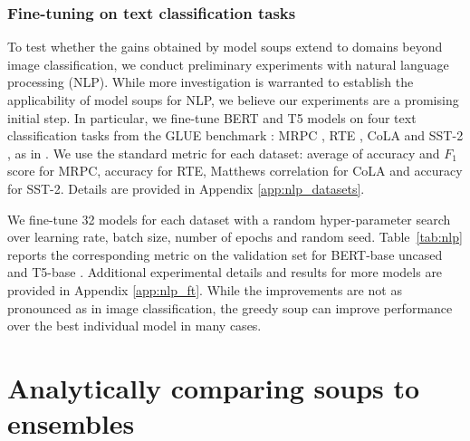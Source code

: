 \documentclass[nohyperref]{article}
\theoremstyle{plain}
\theoremstyle{definition}
\theoremstyle{remark}
\begin{document}
        \subsubsection{Fine-tuning on text classification tasks}\label{sec:nlp}
    
        To test whether the gains obtained by model soups extend to domains beyond image classification, we conduct preliminary experiments with natural language processing (NLP). 
        While more investigation is warranted
        to establish the applicability of model soups for NLP, we believe our experiments are a promising initial step.
        In particular, we fine-tune BERT \cite{devlin2019bert} and T5 \cite{raffel2020t5} models on four text classification tasks from the GLUE benchmark \cite{wang2018glue}: MRPC \cite{dolan2005automatically}, RTE \cite{dagan2005pascal, bar2006second, giampiccolo2007third, bentivogli2009fifth}, CoLA \cite{warstadt2018neural} and SST-2 \cite{socher2013recursive}, as in \cite{dodge2020fine}. We use the standard metric for each dataset: average of accuracy and $F_1$ score for MRPC, accuracy for RTE, Matthews correlation for CoLA \cite{matthews1975comparison} and accuracy for SST-2. Details are provided in Appendix \ref{app:nlp_datasets}.
        
        We fine-tune 32 models for each dataset with a random hyper-parameter search over learning rate, batch size, number of epochs and random seed. Table~\ref{tab:nlp} reports the corresponding metric on the validation set for BERT-base uncased \cite{devlin-etal-2019-bert} and T5-base \cite{raffel2020t5}. Additional experimental details and results for more models are provided in Appendix \ref{app:nlp_ft}. While the improvements are not as pronounced as in image classification, the greedy soup can improve performance over the best individual model in many cases.
        
        
        \section{Analytically comparing soups to ensembles}\label{sec:theory}
          
        \newcommand{\grad}{\nabla}%
        \newcommand{\hess}{\nabla^{2}}%
        \newcommand{\R}{\mathbb{R}}%
        \newcommand{\E}{\mathbb{E}}%
        \newcommand{\err}{\mathrm{err}}
        \newcommand{\errens}{\mathrm{err}^{\mathrm{ens}}}
        \newcommand{\fose}{f_\alpha^{\mathrm{ens}}}%
        \newcommand{\fwse}{f_\alpha^{\mathrm{soup}}}%
        \newcommand{\defeq}{\coloneqq}%
        \newcommand{\indic}[1]{1{\{#1\}}}%
        \newcommand{\exloss}{\mathcal{L}^{\mathrm{soup}}}
        \newcommand{\exlossens}{\mathcal{L}^{\mathrm{ens}}}
        \renewcommand{\d}{\mathrm{d}}
        \newcommand{\softmax}{p_\mathrm{sftmx}}
        
\end{document}
